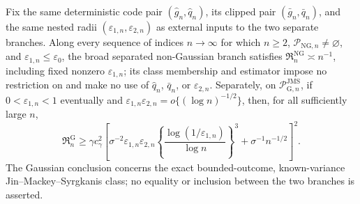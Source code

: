 Fix the same deterministic code pair \((\widehat g_n,\widehat q_n)\), its clipped pair \((\bar g_n,\bar q_n)\), and the same nested radii \((\varepsilon_{1,n},\varepsilon_{2,n})\) as external inputs to the two separate branches. Along every sequence of indices \(n\to\infty\) for which \(n\ge2\), \(\mathcal P_{\mathrm{NG},n}\neq\varnothing\), and \(\varepsilon_{1,n}\le\varepsilon_0\), the broad separated non-Gaussian branch satisfies \(\mathfrak R_n^{\mathrm{NG}}\asymp n^{-1}\), including fixed nonzero \(\varepsilon_{1,n}\); its class membership and estimator impose no restriction on and make no use of \(\widehat q_n\), \(\bar q_n\), or \(\varepsilon_{2,n}\). Separately, on \(\mathcal P_{\mathrm G,n}^{\mathrm{JMS}}\), if \(0<\varepsilon_{1,n}<1\) eventually and \(\varepsilon_{1,n}\varepsilon_{2,n}=o\{(\log n)^{-1/2}\}\), then, for all sufficiently large \(n\),
\[
 \mathfrak R_n^{\mathrm G}\ge\gamma c_{\gamma}^2
 \left[\sigma^{-2}\varepsilon_{1,n}\varepsilon_{2,n}
 \left\{\frac{\log(1/\varepsilon_{1,n})}{\log n}\right\}^3
 +\sigma^{-1}n^{-1/2}\right]^2.
\]
The Gaussian conclusion concerns the exact bounded-outcome, known-variance Jin--Mackey--Syrgkanis class; no equality or inclusion between the two branches is asserted.
